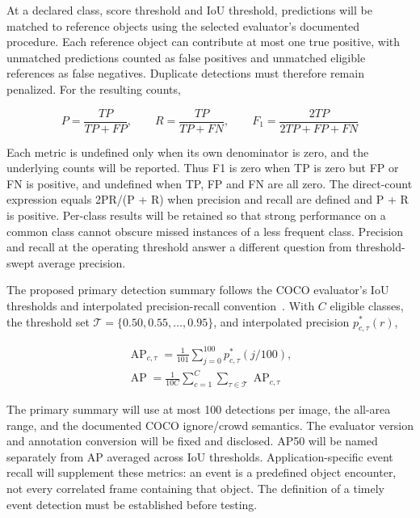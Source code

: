\documentclass[11pt,letterpaper]{article}
\begin{document}
At a declared class, score threshold and IoU threshold, predictions will be matched to reference objects using the selected evaluator's documented procedure. Each reference object can contribute at most one true positive, with unmatched predictions counted as false positives and unmatched eligible references as false negatives. Duplicate detections must therefore remain penalized. For the resulting counts,

\begin{equation}
P=\frac{TP}{TP+FP},\qquad
R=\frac{TP}{TP+FN},\qquad
F_1=\frac{2TP}{2TP+FP+FN}
\label{eq:29}
\end{equation}

Each metric is undefined only when its own denominator is zero, and the underlying counts will be reported. Thus F1 is zero when TP is zero but FP or FN is positive, and undefined when TP, FP and FN are all zero. The direct-count expression equals 2PR/(P + R) when precision and recall are defined and P + R is positive. Per-class results will be retained so that strong performance on a common class cannot obscure missed instances of a less frequent class. Precision and recall at the operating threshold answer a different question from threshold-swept average precision.

The proposed primary detection summary follows the COCO evaluator's IoU thresholds and interpolated precision-recall convention~\cite{ENG_COCO}. With \(C\) eligible classes, the threshold set \(\mathcal T=\{0.50,0.55,\ldots,0.95\}\), and interpolated precision \(p^{*}_{c,\tau}(r)\),

\begin{equation}
\begin{gathered}\operatorname{AP}_{c,\tau}
=\frac{1}{101}\sum_{j=0}^{100}p^{*}_{c,\tau}(j/100),
\\
\operatorname{AP}
=\frac{1}{10C}\sum_{c=1}^{C}\sum_{\tau\in\mathcal T}\operatorname{AP}_{c,\tau}\end{gathered}
\label{eq:30}
\end{equation}

The primary summary will use at most 100 detections per image, the all-area range, and the documented COCO ignore/crowd semantics. The evaluator version and annotation conversion will be fixed and disclosed. AP50 will be named separately from AP averaged across IoU thresholds. Application-specific event recall will supplement these metrics: an event is a predefined object encounter, not every correlated frame containing that object. The definition of a timely event detection must be established before testing.
\end{document}
